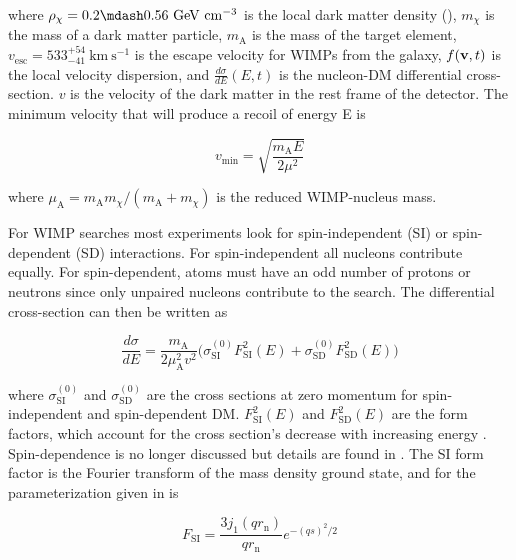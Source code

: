 \noindent where $\rho_{\chi} = 0.2 \mdash 0.56\ \mathrm{GeV\ cm^{-3}}$ is the local dark matter density (),
$m_{\chi}$ is the mass of a
dark matter particle, $m_{\mathrm{A}}$ is the mass of the target element, $v_{\mathrm{esc}}= 533_{-41}^{+54}\ \mathrm{km\ s^{-1}}$
 is the escape velocity for WIMPs from the
galaxy, $f(\mathbf{v}, t)$ is the local velocity dispersion, and $\frac{d\sigma}{dE}(E, t)$ is the nucleon-DM differential
cross-section.  $v$ is the velocity of the dark matter in the rest frame of the detector.  The minimum velocity that will produce
a recoil of energy E is

\begin{equation}
v_{\mathrm{min}} = \sqrt{\frac{m_{\mathrm{A}} E}{2 \mu^{2}}}
\end{equation}

\noindent where $\mu_{\mathrm{A}} = m_{\mathrm{A}} m_{\chi} /( m_{\mathrm{A}} + m_{\chi})$ is the reduced WIMP-nucleus mass.

For WIMP searches most experiments look for spin-independent (SI) or spin-dependent (SD) interactions.  For spin-independent all nucleons
contribute equally.  For spin-dependent, atoms must have an odd number
of protons or neutrons since only unpaired nucleons contribute to the search.  The differential cross-section can then be written as

\begin{equation} \label{eq:diff_sigma_si}
\frac{d \sigma}{dE} = \frac{m_{\mathrm{A}}}{2 \mu_{\mathrm{A}}^{2} v^{2}} \big( \sigma_{\mathrm{SI}}^{(0)} F_{\mathrm{SI}}^{2}(E) +
\sigma_{\mathrm{SD}}^{(0)} F_{\mathrm{SD}}^{2}(E) \big)
\end{equation}

\noindent where $\sigma_{\mathrm{SI}}^{(0)}$ and $\sigma_{\mathrm{SD}}^{(0)}$ are the cross sections at zero momentum for
spin-independent and spin-dependent DM.  $F_{\mathrm{SI}}^{2}(E)$ and $F_{\mathrm{SD}}^{2}(E)$ are the form factors, which
account for the cross section's decrease with increasing energy .  Spin-dependence is no longer discussed but details
are found in .  The SI form factor is
the Fourier transform of the mass density ground state, and for the parameterization given in  is

\begin{equation}
F_{\mathrm{SI}} = \frac{3 j_{1}(qr_{\mathrm{n}})}{qr_{\mathrm{n}}} e^{-(qs)^{2}/2}
\end{equation}

